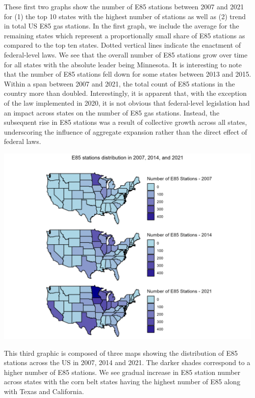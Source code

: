 \documentclass[
]{article}
\begin{document}
These first two graphs show the number of E85 stations between 2007 and
2021 for (1) the top 10 states with the highest number of stations as
well as (2) trend in total US E85 gas stations. In the first graph, we
include the average for the remaining states which represent a
proportionally small share of E85 stations as compared to the top ten
states. Dotted vertical lines indicate the enactment of federal-level
laws. We see that the overall number of E85 stations grow over time for
all states with the absolute leader being Minnesota. It is interesting
to note that the number of E85 stations fell down for some states
between 2013 and 2015. Within a span between 2007 and 2021, the total
count of E85 stations in the country more than doubled. Interestingly,
it is apparent that, with the exception of the law implemented in 2020,
it is not obvious that federal-level legislation had an impact across
states on the number of E85 gas stations. Instead, the subsequent rise
in E85 stations was a result of collective growth across all states,
underscoring the influence of aggregate expansion rather than the direct
effect of federal laws.

\includegraphics[width=6.25in,height=\textheight]{images/e85_overtime_map-01.png}

This third graphic is composed of three maps showing the distribution of
E85 stations across the US in 2007, 2014 and 2021. The darker shades
correspond to a higher number of E85 stations. We see gradual increase
in E85 station number across states with the corn belt states having the
highest number of E85 along with Texas and California.
\end{document}
